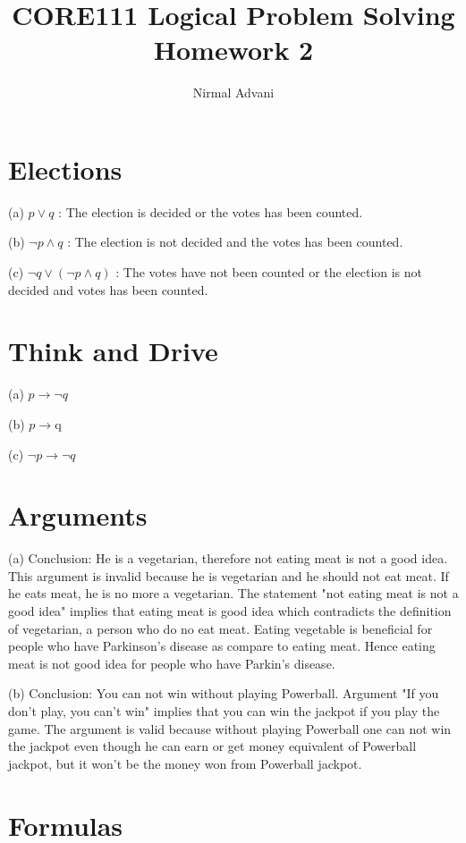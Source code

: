 \documentclass{article}
\title{CORE111 Logical Problem Solving\\Homework 2}
\author{Nirmal Advani}
\begin{document}
\maketitle

\section{Elections}

(a) $p\vee q$ : The election is decided or the votes has been counted.

(b) $\neg p \wedge q$ : The election is not decided and the votes has been counted.

(c) $\neg q\vee (\neg p \wedge q)$ : The votes have not been counted or the election is not decided and votes has been counted. 

\section{Think and Drive}

(a) $p\rightarrow \neg q$

(b) $p\rightarrow $q

(c) $\neg p \rightarrow \neg q$

\section{Arguments}

(a) Conclusion: He is a vegetarian, therefore not eating meat is not a good idea.
This argument is invalid because he is vegetarian and he should not eat meat. If he eats meat, he is no more a vegetarian. The statement "not eating meat is not a good idea" implies that eating meat is good idea  which contradicts the definition of vegetarian, a person who do no eat meat. Eating vegetable is beneficial for people who have Parkinson's disease as compare to eating meat. Hence eating meat is not good idea for people who have Parkin's disease. 


(b) Conclusion: You can not win without playing Powerball.
Argument "If you don't play, you can't win" implies that you can win the jackpot if you play the game. The argument is valid because without playing Powerball one can not win the jackpot even though he can earn or get money equivalent of Powerball jackpot, but it won't be the money won from Powerball jackpot.  

\section{Formulas}
\end{document}
